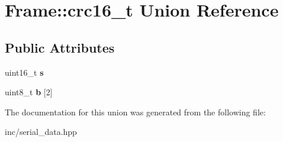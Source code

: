 \hypertarget{unionFrame_1_1crc16__t}{}\section{Frame\+:\+:crc16\+\_\+t Union Reference}
\label{unionFrame_1_1crc16__t}
\subsection*{Public Attributes}
\begin{DoxyCompactItemize}
\item 
\mbox{\label{unionFrame_1_1crc16__t_a75f0d64a53c88b9ff67f716adec48eee}} 
uint16\+\_\+t {\bfseries s}
\item 
\mbox{\label{unionFrame_1_1crc16__t_ac2ba759ef70f7f8ea523bf5145a40e00}} 
uint8\+\_\+t {\bfseries b} \mbox{[}2\mbox{]}
\end{DoxyCompactItemize}


The documentation for this union was generated from the following file\+:\begin{DoxyCompactItemize}
\item 
inc/serial\+\_\+data.\+hpp\end{DoxyCompactItemize}

